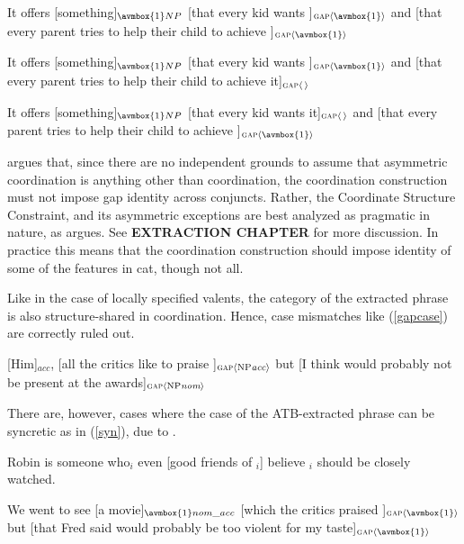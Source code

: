 \documentclass[output=paper]{langsci/langscibook}
\begin{document}
\begin{exe}
\ex \begin{xlista}
\ex It offers [something]$_{\avmbox{1}NP}$  [that every kid wants \spc]$_{\textup{\sc gap} \langle \avmbox{1} \rangle}$ and
[that every parent tries to help their child to achieve \spc]$_{\textup{\sc gap} \langle \avmbox{1} \rangle}$

\ex{*}It offers [something]$_{\avmbox{1}NP}$ [that every kid wants \spc]$_{\textup{\sc gap} \langle \avmbox{1} \rangle}$ and
[that every parent tries to help their child to achieve it]$_{\textup{\sc gap} \langle \, \rangle}$ 

\ex{*}It offers [something]$_{\avmbox{1}NP}$  [that every kid wants it]$_{\textup{\sc gap} \langle \, \rangle}$ and
[that every parent tries to help their child to achieve \spc]$_{\textup{\sc gap} \langle \avmbox{1} \rangle}$
\end{xlista}\label{cs2}
\end{exe}


\citet{chavesextr} argues that, since there are no independent grounds to assume that asymmetric coordination is anything other than coordination, the coordination construction must not impose {\sc gap} identity across conjuncts. Rather, the Coordinate Structure Constraint, and its asymmetric exceptions are best analyzed as
pragmatic in nature, as \citet{kehler} argues. 
See {\bf EXTRACTION CHAPTER} for more discussion.
In practice this means that the coordination construction should impose identity of some of the features in {\sc cat}, though not all.

Like in the case of locally specified valents, the category of the extracted phrase is also structure-shared
in coordination. Hence, case mismatches like (\ref{gapcase}) are
correctly ruled out.


\begin{exe}
\ex
\begin{xlista}
\ex{*}[Him]$_{acc}$,  [all the critics like to praise \spc]$_{\textup{\sc gap} \langle \textup{\scriptsize NP}\emph{acc} \rangle}$
but [I think \spc would probably not be present at the awards]$_{\textup{\sc gap} \langle \textup{\scriptsize NP}\emph{nom} \rangle}$
\end{xlista}\label{gapcase}
\end{exe}

\noindent
There are, however, cases where the case of the ATB-extracted phrase can be syncretic as in (\ref{syn}), 
due to \citet{levineetal}. 

\begin{exe}
\ex
\begin{xlista}
\ex Robin is someone who$_i$ even [good friends of \spc$_i$]
believe \spc$_i$ should be closely watched.

\ex We went to see [a movie]$_{\avmbox{1}nom\_acc}$  [which the critics praised \spc]$_{\textup{\sc gap} \langle \avmbox{1} \rangle}$
but [that Fred said \spc would probably be too violent for my taste]$_{\textup{\sc gap} \langle \avmbox{1} \rangle}$
\end{xlista}
\end{exe}\label{syn}
\end{document}
